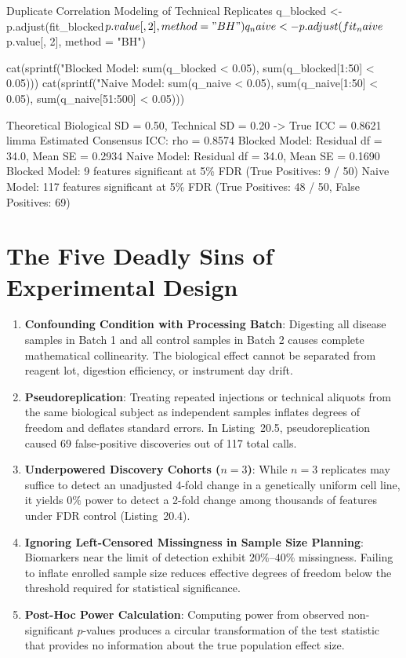\documentclass[11pt,twoside,openright]{book}
\begin{document}
\begin{rchunk}{Duplicate Correlation Modeling of Technical Replicates}
q_blocked <- p.adjust(fit_blocked$p.value[, 2], method = "BH")
q_naive   <- p.adjust(fit_naive$p.value[, 2], method = "BH")

cat(sprintf("Blocked Model: %
            sum(q_blocked < 0.05), sum(q_blocked[1:50] < 0.05)))
cat(sprintf("Naive Model:   %
            sum(q_naive < 0.05), sum(q_naive[1:50] < 0.05), sum(q_naive[51:500] < 0.05)))
\end{rchunk}

\begin{routput}
Theoretical Biological SD = 0.50, Technical SD = 0.20 -> True ICC = 0.8621
limma Estimated Consensus ICC: rho = 0.8574
Blocked Model: Residual df = 34.0, Mean SE = 0.2934
Naive Model:   Residual df = 34.0, Mean SE = 0.1690
Blocked Model: 9 features significant at 5\% FDR (True Positives: 9 / 50)
Naive Model:   117 features significant at 5\% FDR (True Positives: 48 / 50, False Positives: 69)
\end{routput}

\section{The Five Deadly Sins of Experimental Design}

\begin{enumerate}
    \item \textbf{Confounding Condition with Processing Batch}: Digesting all disease samples in Batch 1 and all control samples in Batch 2 causes complete mathematical collinearity. The biological effect cannot be separated from reagent lot, digestion efficiency, or instrument day drift.
    \item \textbf{Pseudoreplication}: Treating repeated injections or technical aliquots from the same biological subject as independent samples inflates degrees of freedom and deflates standard errors. In Listing~20.5, pseudoreplication caused 69 false-positive discoveries out of 117 total calls.
    \item \textbf{Underpowered Discovery Cohorts ($n = 3$)}: While $n=3$ replicates may suffice to detect an unadjusted 4-fold change in a genetically uniform cell line, it yields $0\%$ power to detect a 2-fold change among thousands of features under FDR control (Listing~20.4).
    \item \textbf{Ignoring Left-Censored Missingness in Sample Size Planning}: Biomarkers near the limit of detection exhibit $20\%$--$40\%$ missingness. Failing to inflate enrolled sample size reduces effective degrees of freedom below the threshold required for statistical significance.
    \item \textbf{Post-Hoc Power Calculation}: Computing power from observed non-significant $p$-values produces a circular transformation of the test statistic that provides no information about the true population effect size.
\end{enumerate}
\end{document}
